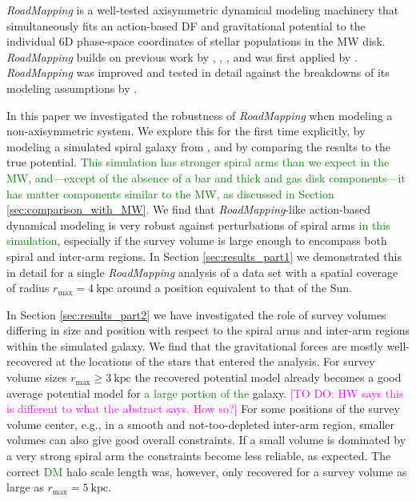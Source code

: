 \documentclass[iop,revtex4,numberedappendix,appendixfloats]{emulateapj}
\newcommand{\RM}{{\sl RoadMapping}}
\newcommand{\Wilma}[1]{\textcolor{Magenta}{#1}}
\newcommand{\NEW}[1]{\textcolor{Green}{#1}}
\newcommand{\OLD}[1]{}
\begin{document}
\RM{} is a well-tested axisymmetric dynamical modeling machinery that simultaneously fits an action-based DF and gravitational potential to the individual 6D phase-space coordinates of stellar populations in the MW disk. \RM{} builds on previous work by \citet{2011MNRAS.413.1889B}, \citet{2012MNRAS.426.1324B}, \citet{2015ApJS..216...29B}, and was first applied by \citet{2013ApJ...779..115B}. \RM{} was improved and tested in detail against the breakdowns of its modeling assumptions by \citet{2016ApJ...830...97T}. 

In this paper we investigated the robustness of \RM{} when modeling a non-axisymmetric system. We explore this for the first time explicitly, by modeling a simulated spiral galaxy from \citet{2013ApJ...766...34D}\OLD{ which has stronger spiral arms than we expect in the MW}, and by comparing the results to the true potential. \NEW{This simulation has stronger spiral arms than we expect in the MW, and---except of the absence of a bar and thick and gas disk components---it has matter components similar to the MW, as discussed in Section \ref{sec:comparison_with_MW}.} We find that \RM{}-like action-based dynamical modeling is very robust against perturbations of spiral arms \NEW{in this simulation}, especially if the survey volume is large enough to encompass both spiral\OLD{s} and inter-arm regions. In Section \ref{sec:results_part1} we demonstrated this in detail for a single \RM{} analysis of a data set with a spatial coverage of radius $r_\text{max}=4~\text{kpc}$ around a position equivalent to that of the Sun.

In Section \ref{sec:results_part2} we have investigated the role of survey volumes differing in size and position with respect to the spiral arms and inter-arm regions within the simulated galaxy. We find that the gravitational forces are mostly well-recovered at the locations of the stars that entered the analysis. For survey volume sizes $r_\text{max} \geq 3~\text{kpc}$ the recovered potential model already becomes a good average potential model for \OLD{the whole}\NEW{a large portion of the} galaxy. \Wilma{[TO DO: HW says this is different to what the abstract says. How so?]} For some positions of the survey volume center, e.g., in a smooth and not-too-depleted inter-arm region, smaller volumes can also give good overall constraints. If a small volume is dominated by a very strong spiral arm the constraints become less reliable, as expected. The correct \OLD{dark matter}\NEW{DM} halo scale length was, however, only recovered for a survey volume as large as $r_\text{max}=5~\text{kpc}$. 
\end{document}
